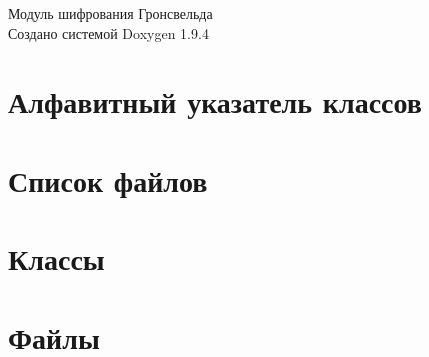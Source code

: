 \documentclass[twoside]{book}
\newcommand{\+}{\discretionary{\mbox{\scriptsize$\hookleftarrow$}}{}{}}
\newcommand{\clearemptydoublepage}{%
    \newpage{\pagestyle{empty}\cleardoublepage}%
  }
\begin{document}
  \raggedbottom
    \hypersetup{pageanchor=false,
                bookmarksnumbered=true,
                pdfencoding=unicode
               }
  \begin{titlepage}
  \vspace*{7cm}
  \begin{center}%
  {\Large Модуль шифрования Гронсвельда}\\
  \vspace*{1cm}
  {\large Создано системой Doxygen 1.9.4}\\
  \end{center}
  \end{titlepage}
  \clearemptydoublepage
  \tableofcontents
  \clearemptydoublepage
  \hypersetup{pageanchor=true}
\chapter{Алфавитный указатель классов}

\chapter{Список файлов}

\chapter{Классы}

\chapter{Файлы}






  \backmatter
  \newpage
  \clearemptydoublepage
  \printindex
\end{document}
